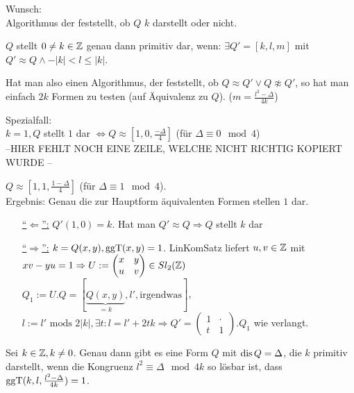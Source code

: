 \documentclass[a4paper,DIV15,BCOR12mm]{article}
\begin{document}
Wunsch:\\
Algorithmus der feststellt, ob $Q$ $k$ darstellt oder nicht.

\begin{satz}[1. Darstellungssatz]
$Q$ stellt $0 \not= k \in \mathbb{Z}$ genau dann primitiv dar, wenn: $\exists Q' = [k,l,m]$ mit $Q' \approx Q \wedge -|k| < l \le |k|$.
\end{satz}
Hat man also einen Algorithmus, der feststellt, ob $Q \approx Q' \vee Q \not\approx Q'$, so hat man einfach $2k$ Formen zu testen (auf Äquivalenz zu $Q$). ($m = \frac{l^2 - \Delta}{4k}$)

Spezialfall:\\
$k = 1, Q$ stellt $1$ dar $\Leftrightarrow Q \approx [1, 0, \frac{-\Delta}{4}]$ (für $\Delta \equiv 0 \mod 4$)\\
--HIER FEHLT NOCH EINE ZEILE, WELCHE NICHT RICHTIG KOPIERT WURDE --

$Q \approx [1, 1, \frac{1 - \Delta}{4}]$ (für $\Delta \equiv 1 \mod 4$).\\
Ergebnis: Genau die zur Hauptform äquivalenten Formen stellen $1$ dar.

\begin{beweis}
\begin{itemize}
\item[\underline{"`$\Leftarrow$"':}] $Q'(1,0) = k$. Hat man $Q' \approx Q \Rightarrow Q$ stellt $k$ dar
\item[\underline{"`$\Rightarrow$"':}] $k = Q(x,y), \mathop{\rm ggT}\nolimits (x,y) = 1$. LinKomSatz liefert $u,v \in \mathbb{Z}$ mit $xv-yu = 1 \Rightarrow U := \begin{pmatrix}x & y\\u & v\end{pmatrix} \in Sl_2(\mathbb{Z})$\\
$Q_1 := U.Q = [\underbrace{Q(x,y)}_{=k}, l', \text{irgendwas}]$, $l := l' \text{ mods } 2|k|, \exists t: l = l' + 2tk \Rightarrow Q' = \begin{pmatrix}1 & \cdot \\ t & 1\end{pmatrix}.Q_1$ wie verlangt.
\end{itemize}
\end{beweis}

\begin{satz}[2. Darstellungssatz]
Sei $k \in \mathbb{Z}, k \not= 0$. Genau dann gibt es eine Form $Q$ mit $\mathop{\rm dis}\nolimits Q = \Delta$, die $k$ primitiv darstellt, wenn die Kongruenz $l^2 \equiv \Delta \mod 4k$ so lösbar ist, dass $\mathop{\rm ggT}\nolimits (k, l, \frac{l^2 - \Delta}{4k}) = 1$.
\end{satz}
\end{document}
